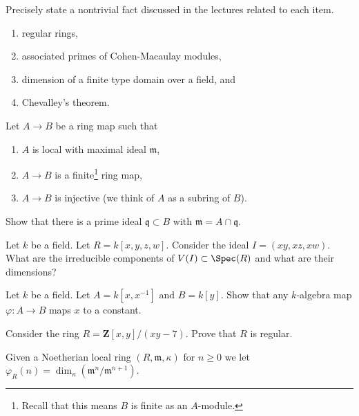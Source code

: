 \begin{exercise}[Theorems]
\label{exercise-results-fall-2016}
Precisely state a nontrivial fact discussed in the lectures related
to each item.
\begin{enumerate}
\item regular rings,
\item associated primes of Cohen-Macaulay modules,
\item dimension of a finite type domain over a field, and
\item Chevalley's theorem.
\end{enumerate}
\end{exercise}

\begin{exercise}
\label{exercise-finite-injective}
Let $A \to B$ be a ring map such that
\begin{enumerate}
\item $A$ is local with maximal ideal $\mathfrak m$,
\item $A \to B$ is a finite\footnote{Recall that this means $B$
is finite as an $A$-module.} ring map,
\item $A \to B$ is injective (we think of $A$ as a subring of $B$).
\end{enumerate}
Show that there is a prime ideal $\mathfrak q \subset B$ with
$\mathfrak m = A \cap \mathfrak q$.
\end{exercise}

\begin{exercise}
\label{exercise-find-components}
Let $k$ be a field. Let $R = k[x, y, z, w]$.
Consider the ideal $I = (xy, xz, xw)$.
What are the irreducible components of
$V(I) \subset \Spec(R)$ and what are their dimensions?
\end{exercise}

\begin{exercise}
\label{exercise-no-nonconstant-morphism}
Let $k$ be a field. Let $A = k[x, x^{-1}]$ and $B = k[y]$.
Show that any $k$-algebra map $\varphi : A \to B$ maps $x$ to a constant.
\end{exercise}

\begin{exercise}
\label{exercise-regular-over-Z}
Consider the ring $R = \mathbf{Z}[x, y]/(xy - 7)$.
Prove that $R$ is regular.
\end{exercise}

\noindent
Given a Noetherian local ring $(R, \mathfrak m, \kappa)$
for $n \geq 0$ we let
$\varphi_R(n) = \dim_\kappa(\mathfrak m^n/\mathfrak m^{n + 1})$.

